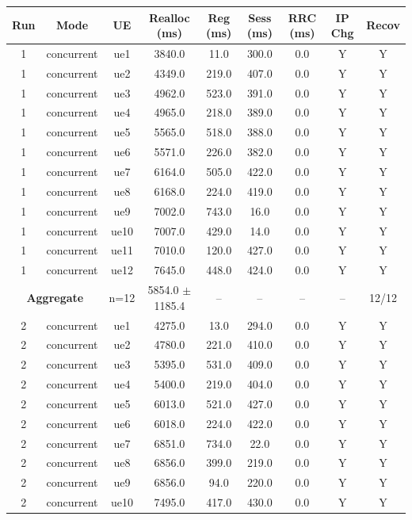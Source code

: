 \begin{table}[ht]
\centering
\begin{tabular}{|c|c|c|c|c|c|c|c|c|}
\hline
Run & Mode & UE & Realloc (ms) & Reg (ms) & Sess (ms) & RRC (ms) & IP Chg & Recov \\
\hline
1 & concurrent & ue1 & 3840.0 & 11.0 & 300.0 & 0.0 & Y & Y \\
1 & concurrent & ue2 & 4349.0 & 219.0 & 407.0 & 0.0 & Y & Y \\
1 & concurrent & ue3 & 4962.0 & 523.0 & 391.0 & 0.0 & Y & Y \\
1 & concurrent & ue4 & 4965.0 & 218.0 & 389.0 & 0.0 & Y & Y \\
1 & concurrent & ue5 & 5565.0 & 518.0 & 388.0 & 0.0 & Y & Y \\
1 & concurrent & ue6 & 5571.0 & 226.0 & 382.0 & 0.0 & Y & Y \\
1 & concurrent & ue7 & 6164.0 & 505.0 & 422.0 & 0.0 & Y & Y \\
1 & concurrent & ue8 & 6168.0 & 224.0 & 419.0 & 0.0 & Y & Y \\
1 & concurrent & ue9 & 7002.0 & 743.0 & 16.0 & 0.0 & Y & Y \\
1 & concurrent & ue10 & 7007.0 & 429.0 & 14.0 & 0.0 & Y & Y \\
1 & concurrent & ue11 & 7010.0 & 120.0 & 427.0 & 0.0 & Y & Y \\
1 & concurrent & ue12 & 7645.0 & 448.0 & 424.0 & 0.0 & Y & Y \\
\multicolumn{2}{|c|}{\textbf{Aggregate}} & n=12 & 5854.0 $\pm$ 1185.4 & -- & -- & -- & -- & 12/12 \\
\hline
2 & concurrent & ue1 & 4275.0 & 13.0 & 294.0 & 0.0 & Y & Y \\
2 & concurrent & ue2 & 4780.0 & 221.0 & 410.0 & 0.0 & Y & Y \\
2 & concurrent & ue3 & 5395.0 & 531.0 & 409.0 & 0.0 & Y & Y \\
2 & concurrent & ue4 & 5400.0 & 219.0 & 404.0 & 0.0 & Y & Y \\
2 & concurrent & ue5 & 6013.0 & 521.0 & 427.0 & 0.0 & Y & Y \\
2 & concurrent & ue6 & 6018.0 & 224.0 & 422.0 & 0.0 & Y & Y \\
2 & concurrent & ue7 & 6851.0 & 734.0 & 22.0 & 0.0 & Y & Y \\
2 & concurrent & ue8 & 6856.0 & 399.0 & 219.0 & 0.0 & Y & Y \\
2 & concurrent & ue9 & 6856.0 & 94.0 & 220.0 & 0.0 & Y & Y \\
2 & concurrent & ue10 & 7495.0 & 417.0 & 430.0 & 0.0 & Y & Y \\

\end{tabular}
\end{table}
